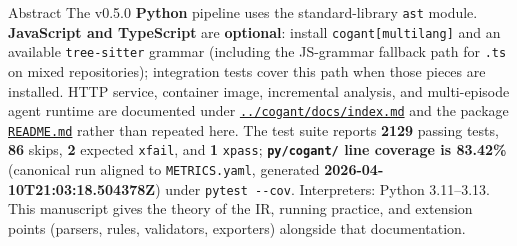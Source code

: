 \documentclass[
  ignorenonframetext,
]{beamer}
\begin{document}
\begin{frame}[fragile]{Abstract}
The v0.5.0 \textbf{Python} pipeline uses the standard-library
\texttt{ast} module. \textbf{JavaScript and TypeScript} are
\textbf{optional}: install \texttt{cogant{[}multilang{]}} and an
available \texttt{tree-sitter} grammar (including the JS-grammar
fallback path for \texttt{.ts} on mixed repositories); integration tests
cover this path when those pieces are installed. HTTP service, container
image, incremental analysis, and multi-episode agent runtime are
documented under
\href{../cogant/docs/index.md}{\texttt{../cogant/docs/index.md}} and the
package \href{../cogant/README.md}{\texttt{README.md}} rather than
repeated here. The test suite reports \textbf{2129} passing tests,
\textbf{86} skips, \textbf{2} expected \texttt{xfail}, and \textbf{1}
\texttt{xpass}; \textbf{\texttt{py/cogant/} line coverage is 83.42\%}
(canonical run aligned to \texttt{METRICS.yaml}, generated
\textbf{2026-04-10T21:03:18.504378Z}) under \texttt{pytest\ -\/-cov}.
Interpreters: Python 3.11--3.13. This manuscript gives the theory of the
IR, running practice, and extension points (parsers, rules, validators,
exporters) alongside that documentation.
\end{frame}
\end{document}
